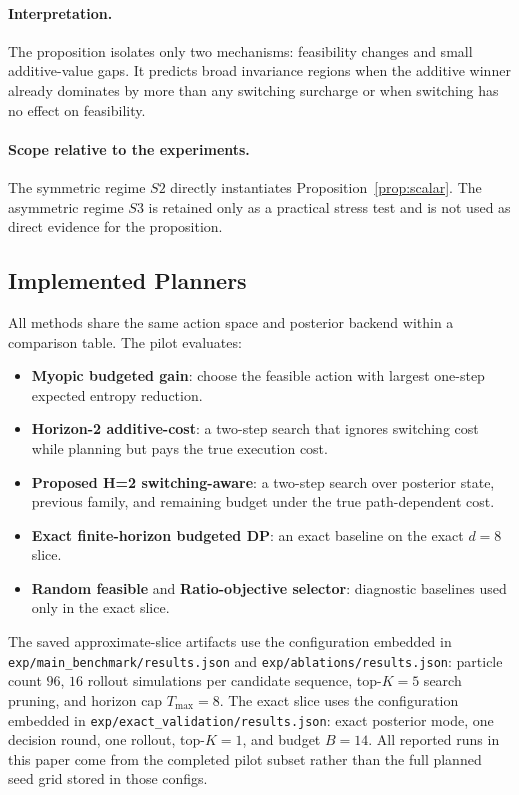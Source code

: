 \documentclass[10pt]{article}
\begin{document}
\paragraph{Interpretation.}
The proposition isolates only two mechanisms: feasibility changes and small additive-value gaps. It predicts broad invariance regions when the additive winner already dominates by more than any switching surcharge or when switching has no effect on feasibility.

\paragraph{Scope relative to the experiments.}
The symmetric regime $S2$ directly instantiates Proposition~\ref{prop:scalar}. The asymmetric regime $S3$ is retained only as a practical stress test and is not used as direct evidence for the proposition.

\subsection{Implemented Planners}
All methods share the same action space and posterior backend within a comparison table. The pilot evaluates:
\begin{itemize}[leftmargin=1.1em]
  \item \textbf{Myopic budgeted gain}: choose the feasible action with largest one-step expected entropy reduction.
  \item \textbf{Horizon-2 additive-cost}: a two-step search that ignores switching cost while planning but pays the true execution cost.
  \item \textbf{Proposed H=2 switching-aware}: a two-step search over posterior state, previous family, and remaining budget under the true path-dependent cost.
  \item \textbf{Exact finite-horizon budgeted DP}: an exact baseline on the exact $d{=}8$ slice.
  \item \textbf{Random feasible} and \textbf{Ratio-objective selector}: diagnostic baselines used only in the exact slice.
\end{itemize}

The saved approximate-slice artifacts use the configuration embedded in \texttt{exp/main\_benchmark/results.json} and \texttt{exp/ablations/results.json}: particle count $96$, $16$ rollout simulations per candidate sequence, top-$K=5$ search pruning, and horizon cap $T_{\max}=8$. The exact slice uses the configuration embedded in \texttt{exp/exact\_validation/results.json}: exact posterior mode, one decision round, one rollout, top-$K=1$, and budget $B=14$. All reported runs in this paper come from the completed pilot subset rather than the full planned seed grid stored in those configs.
\end{document}
